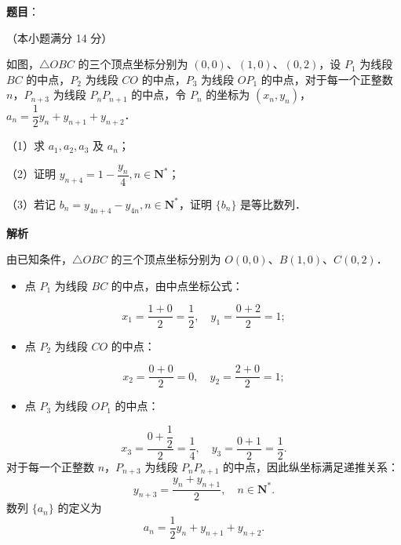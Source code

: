 \begin{answer}

\textbf{题目}：

（本小题满分 14 分）

如图，$\triangle OBC$ 的三个顶点坐标分别为 $(0, 0)$、$(1, 0)$、$(0, 2)$，设 $P_1$ 为线段 $BC$ 的中点，$P_2$ 为线段 $CO$ 的中点，$P_3$ 为线段 $OP_1$ 的中点，对于每一个正整数 $n$，$P_{n+3}$ 为线段 $P_n P_{n+1}$ 的中点，令 $P_n$ 的坐标为 $(x_n, y_n)$，$a_n = \dfrac{1}{2}y_n + y_{n+1} + y_{n+2}$．

（1）求 $a_1, a_2, a_3$ 及 $a_n$；

（2）证明 $y_{n+4} = 1 - \dfrac{y_n}{4}, n \in \mathbf{N}^*$；

（3）若记 $b_n = y_{4n+4} - y_{4n}, n \in \mathbf{N}^*$，证明 $\{b_n\}$ 是等比数列．
\nopagebreak[4]
\begin{center}\end{center}
\nopagebreak[4]
\textbf{解析}
\nopagebreak[4]
\begin{center}\end{center}
\nopagebreak[4]
由已知条件，$\triangle OBC$ 的三个顶点坐标分别为 $O(0, 0)$、$B(1, 0)$、$C(0, 2)$．
\begin{itemize}
\item 点 $P_1$ 为线段 $BC$ 的中点，由中点坐标公式：
\end{itemize}
\nopagebreak[4]
\[
x_1 = \frac{1 + 0}{2} = \frac{1}{2}, \quad y_1 = \frac{0 + 2}{2} = 1;
\]
\begin{itemize}
\item 点 $P_2$ 为线段 $CO$ 的中点：
\end{itemize}
\nopagebreak[4]
\[
x_2 = \frac{0 + 0}{2} = 0, \quad y_2 = \frac{2 + 0}{2} = 1;
\]
\begin{itemize}
\item 点 $P_3$ 为线段 $OP_1$ 的中点：
\end{itemize}
\nopagebreak[4]
\[
x_3 = \frac{0 + \dfrac{1}{2}}{2} = \frac{1}{4}, \quad y_3 = \frac{0 + 1}{2} = \frac{1}{2}.
\]
对于每一个正整数 $n$，$P_{n+3}$ 为线段 $P_n P_{n+1}$ 的中点，因此纵坐标满足递推关系：
\nopagebreak[4]
\[
y_{n+3} = \frac{y_n + y_{n+1}}{2}, \quad n \in \mathbf{N}^*.
\]
数列 $\{a_n\}$ 的定义为
\nopagebreak[4]
\[
a_n = \frac{1}{2}y_n + y_{n+1} + y_{n+2}.
\]


\end{answer}
